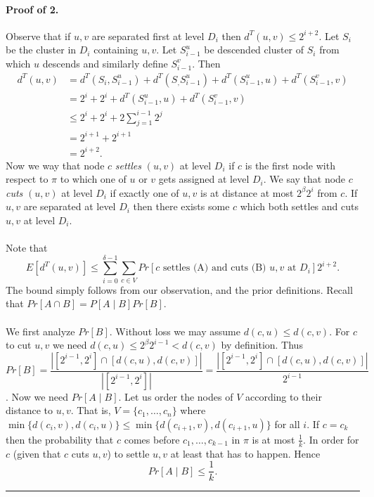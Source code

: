 \documentclass[letterpaper,12pt,oneside,onecolumn]{article}
\newenvironment{proof}{{\bf Proof:  }}{\hfill\rule{2mm}{2mm}}
\begin{document}
\begin{proof}
\paragraph{Proof of 2.}
Observe that if $u,v$ are separated first at level $D_i$ then $d^T(u,v) \leq 2^{i+2}$. Let $S_i$ be the cluster in $D_i$ containing $u,v$. Let $S^u_{i-1}$ be descended cluster of $S_i$ from which $u$ descends and similarly define $S^v_{i-1}$. Then 
\begin{align*}
d^T(u,v) &= d^T(S_i, S^u_{i-1}) + d^T(S_, S^u_{i-1}) + d^T(S^u_{i-1}, u) + d^T(S^v_{i-1}, v)\\
&= 2^i + 2^i +  d^T(S^u_{i-1}, u) + d^T(S^v_{i-1}, v) \\
&\leq 2^i + 2^i + 2\sum_{j = 1}^{i-1} 2^j \\
&= 2^{i+1} + 2^{i+1} \\
&= 2^{i+2}.
\end{align*}
Now we way that node $c$ {\it settles} $(u,v)$ at level $D_i$ if $c$ is the first node with respect to $\pi$ to which one of $u$ or $v$ gets assigned at level $D_i$. We say that node $c$ {\it cuts} $(u,v)$ at level $D_i$ if exactly one of $u,v$ is at distance at most $2^\beta 2^i$ from $c$. If $u,v$ are separated at level $D_i$ then there exists some $c$ which both settles and cuts $u,v$ at level $D_i$.
\paragraph{}
Note that $$E[d^T(u,v)] \leq \sum_{i=0}^{\delta - 1} \sum_{c \in V} Pr [ \text{$c$ settles (A) and cuts (B) $u,v$ at $D_i$}] 2^{i+2}.$$ The bound simply follows from our observation, and the prior definitions. Recall that $Pr[A \cap B] = P[A\mid B] Pr[B]$.
\paragraph{}
We first analyze $Pr[B]$. Without loss we may assume $d(c,u) \leq d(c,v)$. For $c$ to cut $u,v$ we need $d(c,u) \leq 2^\beta 2^{i-1} < d(c,v)$ by definition. Thus
$$Pr[B] = \frac{| [2^{i-1},2^i] \cap [d(c,u),d(c,v)]|}{|[2^{i-1},2^i]|} = \frac{| [2^{i-1},2^i] \cap [d(c,u),d(c,v)]|}{2^{i-1}}$$.
Now we need $Pr[A \mid B]$. Let us order the nodes of $V$ according to their distance to $u,v$. That is, $V = \{c_1, \dots, c_n\}$ where $\min\{d(c_i, v), d(c_i, u)\} \leq \min \{d(c_{i+1}, v), d(c_{i+1}, u)\}$ for all $i$. If $c= c_k$ then the probability that $c$ comes before $c_1, \dots, c_{k-1}$ in $\pi$ is at most $\frac{1}{k}$. In order for $c$ (given that $c$ cuts $u,v$) to settle $u,v$ at least that has to happen. Hence
$$Pr[A \mid B] \leq \frac{1}{k}.$$

\end{proof}
\end{document}
